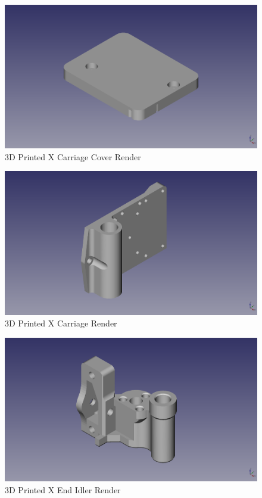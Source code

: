 \begin{figure}[H]
\centering
\includegraphics[keepaspectratio=true,angle=0,height=1.0\textheight,width=1.0\textwidth]{STL/xcarriagecover.stl.png}
\caption{3D Printed X Carriage Cover Render}
\label{fig:xcarriagecoverrender}
\end{figure}

\begin{figure}[H]
\centering
\includegraphics[keepaspectratio=true,angle=0,height=1.0\textheight,width=1.0\textwidth]{STL/xcarriage.stl.png}
\caption{3D Printed X Carriage Render}
\label{fig:xcarriagerender}
\end{figure}

\begin{figure}[H]
\centering
\includegraphics[keepaspectratio=true,angle=0,height=1.0\textheight,width=1.0\textwidth]{STL/xendidler.stl.png}
\caption{3D Printed X End Idler Render}
\label{fig:xendidlerrender}
\end{figure}

